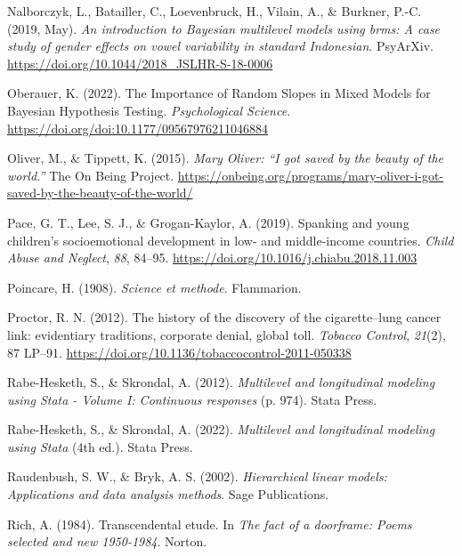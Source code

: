 \documentclass[
  letterpaper,
  DIV=11,
  numbers=noendperiod]{scrreprt}
\newlength{\cslhangindent}
\newenvironment{CSLReferences}[2] %
 {\begin{list}{}{%
  \setlength{\itemindent}{0pt}
  \setlength{\leftmargin}{0pt}
  \setlength{\parsep}{0pt}
  \ifodd #1
   \setlength{\leftmargin}{\cslhangindent}
   \setlength{\itemindent}{-1\cslhangindent}
  \fi
  \setlength{\itemsep}{#2\baselineskip}}}
 {\end{list}}
\begin{document}
\begin{CSLReferences}{1}{0}
Nalborczyk, L., Batailler, C., Loevenbruck, H., Vilain, A., \& Burkner,
P.-C. (2019, May). \emph{An introduction to {B}ayesian multilevel models
using brms: A case study of gender effects on vowel variability in
standard {I}ndonesian}. PsyArXiv.
\url{https://doi.org/10.1044/2018_JSLHR-S-18-0006}

Oberauer, K. (2022). {The Importance of Random Slopes in Mixed Models
for Bayesian Hypothesis Testing}. \emph{Psychological Science}.
\url{https://doi.org/doi:10.1177/09567976211046884}

Oliver, M., \& Tippett, K. (2015). \emph{{M}ary {O}liver: {``{I} got
saved by the beauty of the world.''}} The On Being Project.
\url{https://onbeing.org/programs/mary-oliver-i-got-saved-by-the-beauty-of-the-world/}

Pace, G. T., Lee, S. J., \& Grogan-Kaylor, A. (2019). {Spanking and
young children's socioemotional development in low- and middle-income
countries}. \emph{Child Abuse and Neglect}, \emph{88}, 84--95.
\url{https://doi.org/10.1016/j.chiabu.2018.11.003}

Poincare, H. (1908). \emph{Science et methode}. Flammarion.

Proctor, R. N. (2012). {The history of the discovery of the
cigarette--lung cancer link: evidentiary traditions, corporate denial,
global toll}. \emph{Tobacco Control}, \emph{21}(2), 87 LP--91.
\url{https://doi.org/10.1136/tobaccocontrol-2011-050338}

Rabe-Hesketh, S., \& Skrondal, A. (2012). \emph{Multilevel and
longitudinal modeling using {S}tata - {V}olume {I}: Continuous
responses} (p. 974). Stata Press.

Rabe-Hesketh, S., \& Skrondal, A. (2022). \emph{Multilevel and
longitudinal modeling using {S}tata} (4th ed.). Stata Press.

Raudenbush, S. W., \& Bryk, A. S. (2002). \emph{Hierarchical linear
models: Applications and data analysis methods}. Sage Publications.

Rich, A. (1984). Transcendental etude. In \emph{The fact of a doorframe:
Poems selected and new 1950-1984}. Norton.


\end{CSLReferences}
\end{document}
